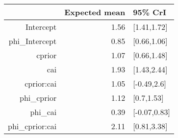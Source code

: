 \begin{tabular}{rrl}
  \hline
 & Expected mean & 95\% CrI \\ 
  \hline
Intercept & 1.56 & [1.41,1.72] \\ 
  phi\_Intercept & 0.85 & [0.66,1.06] \\ 
  cprior & 1.07 & [0.66,1.48] \\ 
  cai & 1.93 & [1.43,2.44] \\ 
  cprior:cai & 1.05 & [-0.49,2.6] \\ 
  phi\_cprior & 1.12 & [0.7,1.53] \\ 
  phi\_cai & 0.39 & [-0.07,0.83] \\ 
  phi\_cprior:cai & 2.11 & [0.81,3.38] \\ 
   \hline
\end{tabular}

